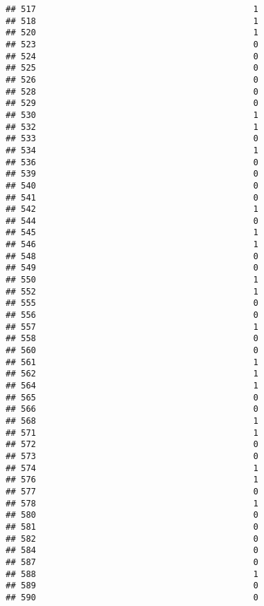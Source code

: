 \documentclass[
]{article}
\begin{document}
\begin{verbatim}
## 517                                           1
## 518                                           1
## 520                                           1
## 523                                           0
## 524                                           0
## 525                                           0
## 526                                           0
## 528                                           0
## 529                                           0
## 530                                           1
## 532                                           1
## 533                                           0
## 534                                           1
## 536                                           0
## 539                                           0
## 540                                           0
## 541                                           0
## 542                                           1
## 544                                           0
## 545                                           1
## 546                                           1
## 548                                           0
## 549                                           0
## 550                                           1
## 552                                           1
## 555                                           0
## 556                                           0
## 557                                           1
## 558                                           0
## 560                                           0
## 561                                           1
## 562                                           1
## 564                                           1
## 565                                           0
## 566                                           0
## 568                                           1
## 571                                           1
## 572                                           0
## 573                                           0
## 574                                           1
## 576                                           1
## 577                                           0
## 578                                           1
## 580                                           0
## 581                                           0
## 582                                           0
## 584                                           0
## 587                                           0
## 588                                           1
## 589                                           0
## 590                                           0

\end{verbatim}
\end{document}
